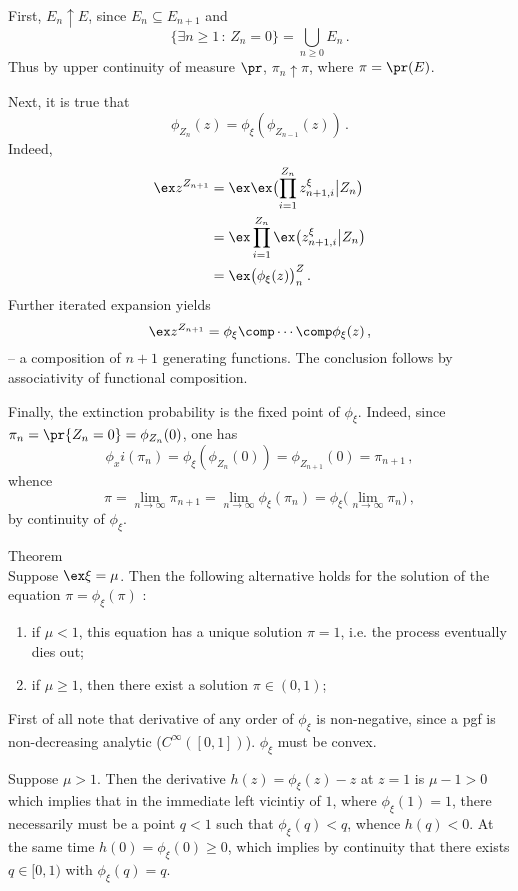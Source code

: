 First, $E_n\uparrow E$, since $E_n\subseteq E_{n+1}$ and 
\[ \{ \exists n\geq 1\,:\, Z_n = 0 \} = \bigcup_{n\geq 0} E_n \,. \]
Thus by upper continuity of measure $\pr$, $\pi_n\uparrow \pi$, where $\pi=\pr(E)$.

Next, it is true that 
\[ \phi_{Z_n}(z) = \phi_\xi(\phi_{Z_{n-1}}(z) ) \,.\]
Indeed, \begin{align*}
	\ex z^{Z_{n+1}}
		&= \ex\ex\bigl( \prod_{i=1}^{Z_n} z^\xi_{n+1,i} \bigr. \bigr\lvert Z_n\bigr)\\
		&= \ex\prod_{i=1}^{Z_n}\ex\bigl( z^\xi_{n+1,i} \bigr. \bigr\lvert Z_n\bigr)\\
		&= \ex\bigl( \phi_\xi(z) \bigr)^Z_n\,.
\end{align*}
Further iterated expansion yields
\[ \ex z^{Z_{n+1}} = \phi_\xi \comp \cdots \comp \phi_\xi (z) \,, \]
-- a composition of $n+1$ generating functions. The conclusion follows by associativity
of functional composition.

Finally,  the extinction probability is the fixed point of $\phi_\xi$. Indeed,
since $\pi_n = \pr\{Z_n = 0\} = \phi_{Z_n}(0)$, one has
\[ \phi_xi( \pi_n ) = \phi_\xi(\phi_{Z_n}(0)) = \phi_{Z_{n+1}}(0) = \pi_{n+1} \,,\]
whence
\[
	\pi = \lim_{n\to \infty} \pi_{n+1}
		= \lim_{n\to \infty} \phi_\xi(\pi_n)
		= \phi_\xi\bigl(\lim_{n\to \infty} \pi_n\bigr) \,, \]
by continuity of $\phi_\xi$.

\noindent Theorem \hfill\\
Suppose $\ex \xi = \mu$. Then the following alternative holds for the solution of
the equation $\pi=\phi_\xi(\pi)$ :
\begin{enumerate}
	\item if $\mu < 1$, this equation has a unique solution $\pi=1$, i.e. the process
	eventually dies out;
	\item if $\mu \geq 1$, then there exist a solution $\pi\in(0,1)$;
\end{enumerate}

First of all note that derivative of any order of $\phi_\xi$ is non-negative, since
a pgf is non-decreasing analytic ($C^\infty([0,1])$).
$\phi_\xi$ must be convex. 

Suppose $\mu>1$. Then the derivative $h(z) = \phi_\xi(z) - z$ at $z=1$ is $\mu-1>0$
which implies that in the immediate left vicintiy of $1$, where $\phi_\xi(1)=1$, there
necessarily must be a point $q<1$ such that $\phi_\xi(q)<q$, whence $h(q)<0$. At the
same time $h(0) = \phi_\xi(0) \geq 0$, which implies by continuity that there exists
$q\in[0,1)$ with $\phi_\xi(q)=q$.

